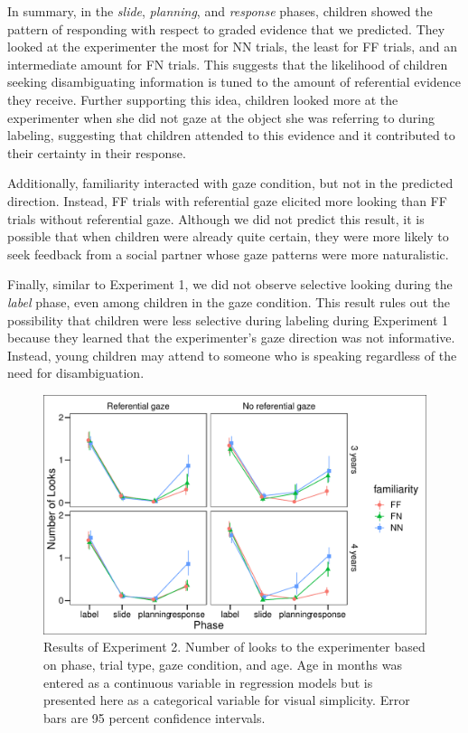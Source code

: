 \documentclass[english,,man]{apa6}
\begin{document}
In summary, in the \emph{slide}, \emph{planning}, and \emph{response}
phases, children showed the pattern of responding with respect to graded
evidence that we predicted. They looked at the experimenter the most for
NN trials, the least for FF trials, and an intermediate amount for FN
trials. This suggests that the likelihood of children seeking
disambiguating information is tuned to the amount of referential
evidence they receive. Further supporting this idea, children looked
more at the experimenter when she did not gaze at the object she was
referring to during labeling, suggesting that children attended to this
evidence and it contributed to their certainty in their response.

Additionally, familiarity interacted with gaze condition, but not in the
predicted direction. Instead, FF trials with referential gaze elicited
more looking than FF trials without referential gaze. Although we did
not predict this result, it is possible that when children were already
quite certain, they were more likely to seek feedback from a social
partner whose gaze patterns were more naturalistic.

Finally, similar to Experiment 1, we did not observe selective looking
during the \emph{label} phase, even among children in the gaze
condition. This result rules out the possibility that children were less
selective during labeling during Experiment 1 because they learned that
the experimenter's gaze direction was not informative. Instead, young
children may attend to someone who is speaking regardless of the need
for disambiguation.

\begin{figure}
\centering
\includegraphics{figs/resultse2-1.pdf}
\caption{\label{fig:resultse2}Results of Experiment 2. Number of looks to
the experimenter based on phase, trial type, gaze condition, and age.
Age in months was entered as a continuous variable in regression models
but is presented here as a categorical variable for visual simplicity.
Error bars are 95 percent confidence intervals.}
\end{figure}
\end{document}
